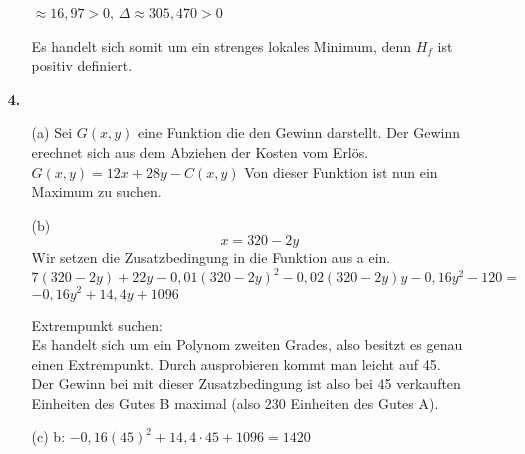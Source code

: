 \documentclass[a4paper,11pt,fleqn]{scrartcl}
\begin{document}
\begin{enumerate}
\begin{enumerate}
                $\approx 16,97 > 0$,
                $\Delta \approx 305,470 > 0$

                Es handelt sich somit um ein strenges lokales Minimum, denn $H_f$ ist positiv definiert.
        \end{enumerate}
    \item[\textbf{4.}]
        \begin{enumerate}
            \item[(a)]
                Sei $G(x,y)$ eine Funktion die den Gewinn darstellt. 
                Der Gewinn erechnet sich aus dem Abziehen der Kosten vom Erlös.
                $G(x,y) = 12x + 28y - C(x,y)$
                Von dieser Funktion ist nun ein Maximum zu suchen.
            \item[(b)]
                \[x = 320 - 2y\]
                Wir setzen die Zusatzbedingung in die Funktion aus a ein. \\
                $7(320 - 2y) + 22y - 0,01(320 - 2y)^2 - 0,02(320 - 2y)y - 0,16y^2 -120 =$
                $-0,16y^2 + 14,4y + 1096$

                Extrempunkt suchen: \\
                Es handelt sich um ein Polynom zweiten Grades, also besitzt es genau einen Extrempunkt. Durch ausprobieren kommt man leicht auf 45. \\
                Der Gewinn bei mit dieser Zusatzbedingung ist also bei 45 verkauften Einheiten des Gutes B maximal (also 230 Einheiten des Gutes A).
            \item[(c)]
                b: $-0,16(45)^2 + 14,4 \cdot 45 + 1096 = 1420$
        \end{enumerate}
\end{enumerate}
\end{document}
